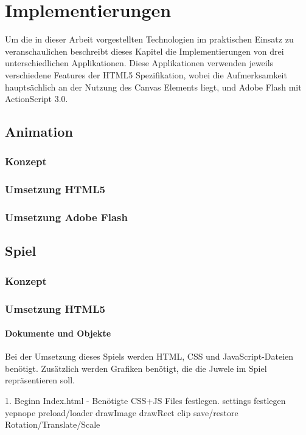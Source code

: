 \chapter{Implementierungen}

Um die in dieser Arbeit vorgestellten Technologien im praktischen Einsatz zu
veranschaulichen beschreibt dieses Kapitel die Implementierungen von drei
unterschiedlichen Applikationen. Diese Applikationen verwenden jeweils
verschiedene Features der HTML5 Spezifikation, wobei die Aufmerksamkeit
hauptsächlich an der Nutzung des Canvas Elements liegt, und Adobe Flash mit
ActionScript 3.0.

\section{Animation}

\subsection{Konzept}
\subsection{Umsetzung HTML5}
\subsection{Umsetzung Adobe Flash}

\section{Spiel}

\subsection{Konzept}
\subsection{Umsetzung HTML5}

  \subsubsection{Dokumente und Objekte}
  Bei der Umsetzung dieses Spiels werden HTML, CSS und JavaScript-Dateien
  benötigt. Zusätzlich werden Grafiken benötigt, die die Juwele im Spiel
  repräsentieren soll.

  1. Beginn
  Index.html - Benötigte CSS+JS Files festlegen.
  settings festlegen
  yepnope preload/loader
  drawImage
  drawRect
  clip
  save/restore
  Rotation/Translate/Scale

